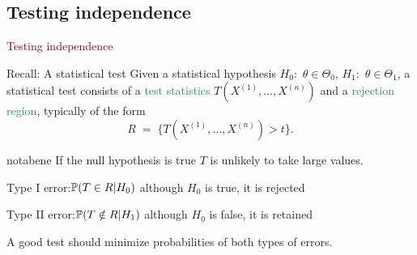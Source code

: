 \documentclass[11pt,handout,aspectratio=169,dvipsnames]{beamer}
\begin{document}
\subsection{Testing independence}
\begin{frame}{}
\begin{center}
	{\huge \textcolor{DarkRed}{Testing independence}}
\end{center}
\end{frame}

\begin{frame}{Recall: A statistical test}
	Given a statistical hypothesis $H_0:$ $\theta\in \Theta_0$, $H_1:$ $\theta\in \Theta_1$, a statistical test consists of a \textcolor{SeaGreen}{test statistics} $T(X^{(1)},\ldots,X^{(n)})$ and a \textcolor{SeaGreen}{rejection region}, typically of the form
	$$
	R\;=\;\{T(X^{(1)},\ldots,X^{(n)})>t\}.
	$$ 
\begin{beamercolorbox}[wd=\paperwidth,sep=2pt]{notabene}	
If the null hypothesis is true $T$ is unlikely to take large values. \end{beamercolorbox}
\begin{alertblock}{Type I error:\quad $\P(T\in R|H_0)$} 
	although $H_0$ is true, it is rejected 
\end{alertblock}
\begin{alertblock}{Type II error:\quad $\P(T\notin R|H_1)$} 
	although $H_0$ is false, it is retained\end{alertblock}
\noindent A good test should minimize probabilities of both types of errors.\\[.2cm]
\end{frame}

\end{document}
